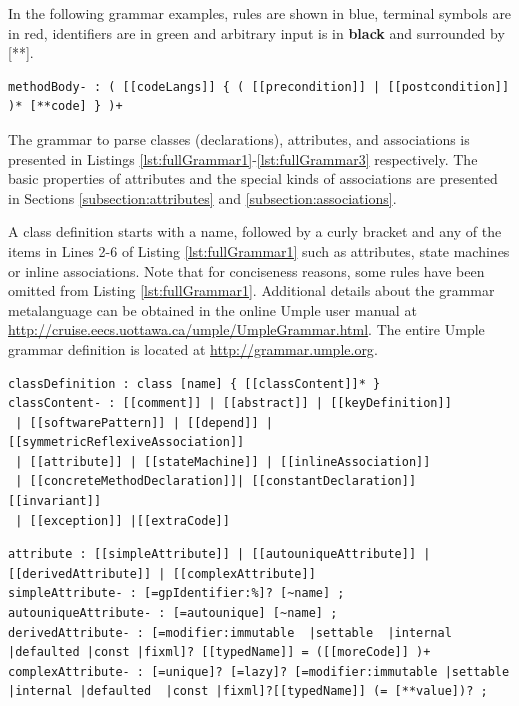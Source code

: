 In the following grammar examples, {\color{variableBlue}rules} are shown in blue, {\color{keywordRed}terminal} symbols are in red, {\color{stringGreen}identifiers} are in green and arbitrary input is in \textbf{black} and surrounded by [**]. 

\begin{lstlisting}[language={grammar}, label=lst:grammarExtra,caption=Grammar for Umple classes]
methodBody- : ( [[codeLangs]] { ( [[precondition]] | [[postcondition]] )* [**code] } )+
\end{lstlisting}

The grammar to parse classes (declarations), attributes, and associations is presented in Listings \ref{lst:fullGrammar1}-\ref{lst:fullGrammar3} respectively. The basic properties of attributes and the special kinds of associations are presented in Sections \ref{subsection:attributes} and \ref{subsection:associations}.

A class definition starts with a name, followed by a curly bracket and any of the items in Lines 2-6 of Listing \ref{lst:fullGrammar1} such as attributes, state machines or inline associations. Note that for conciseness reasons, some rules have been omitted from Listing \ref{lst:fullGrammar1}. Additional details about the grammar metalanguage can be obtained in the online Umple user manual at \url{http://cruise.eecs.uottawa.ca/umple/UmpleGrammar.html}. The entire Umple grammar definition is located at \url{http://grammar.umple.org}.


\begin{lstlisting}[language={grammar}, label=lst:fullGrammar1,caption=Umple grammar for classes]
classDefinition : class [name] { [[classContent]]* }
classContent- : [[comment]] | [[abstract]] | [[keyDefinition]] 
 | [[softwarePattern]] | [[depend]] | [[symmetricReflexiveAssociation]]
 | [[attribute]] | [[stateMachine]] | [[inlineAssociation]] 
 | [[concreteMethodDeclaration]]| [[constantDeclaration]] [[invariant]] 
 | [[exception]] |[[extraCode]]
\end{lstlisting}

\begin{lstlisting}[language={grammar}, label=lst:fullGrammar2,caption=Umple grammar for attributes]
attribute : [[simpleAttribute]] | [[autouniqueAttribute]] | [[derivedAttribute]] | [[complexAttribute]]
simpleAttribute- : [=gpIdentifier:%]? [~name] ;
autouniqueAttribute- : [=autounique] [~name] ;
derivedAttribute- : [=modifier:immutable  |settable  |internal |defaulted |const |fixml]? [[typedName]] = ([[moreCode]] )+
complexAttribute- : [=unique]? [=lazy]? [=modifier:immutable |settable |internal |defaulted  |const |fixml]?[[typedName]] (= [**value])? ;
\end{lstlisting}

